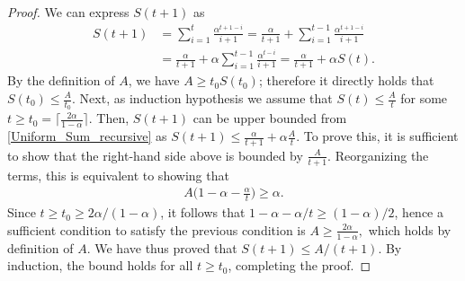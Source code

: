 \documentclass[conference]{IEEEtran}
\newcommand{\nm}[1]{\textcolor{magenta}{\bf [NM: #1]}}
\begin{document}
\begin{proof}
We can express $S(t+1)$ as
    \begin{align}
        S(t+1) &=\sum_{i=1}^{t}  \frac{\alpha^{t+1-i}}{i+1}= \frac{\alpha}{t+1} + \sum_{i=1}^{t-1}  \frac{\alpha^{t+1-i}}{i+1}\nonumber\\
        &= \frac{\alpha}{t+1} + \alpha \sum_{i=1}^{t-1}  \frac{\alpha^{t-i}}{i+1} = \frac{\alpha}{t+1} + \alpha S(t).\label{Uniform_Sum_recursive}
    \end{align}
By the definition of $A$, we have $A \geq t_0S(t_0)$; therefore it directly holds that $S(t_0) \leq \frac{A}{t_0}$. Next, as induction hypothesis we assume that $S(t) \leq \frac{A}{t}$ for some $t\geq t_0 = \lceil \frac{2\alpha}{1-\alpha}\rceil$. 
    Then, $S(t+1)$ can be upper bounded from \eqref{Uniform_Sum_recursive} as $S(t+1) \leq \frac{\alpha}{t+1} + \alpha \frac{A}{t}$. To prove this, it is sufficient to show that the right-hand side above is bounded by $\frac{A}{t+1}$. Reorganizing the terms, this is equivalent to showing that 
    \begin{align*}
        A\big(1 - \alpha -\frac{\alpha}{t}\big)\geq\alpha.
    \end{align*}
    Since $t\geq t_0\geq 2\alpha/(1-\alpha)$, it follows that 
    $1-\alpha-\alpha/t\geq(1-\alpha)/2$, hence a sufficient condition to satisfy the previous condition is
    $
    A\geq \frac{2\alpha}{1-\alpha},
    $
which holds by definition of $A$.
    We have thus proved that $S(t+1)\leq A/(t+1)$. By induction, the bound holds for all $t \geq t_0$, completing the proof.
\end{proof}
\end{document}
